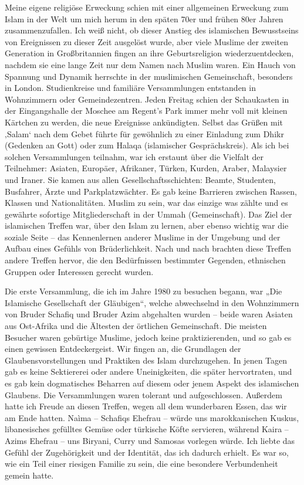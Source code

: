 \documentclass[12pt]{memoir}
\begin{document}
Meine eigene religiöse Erweckung schien
mit einer allgemeinen Erweckung zum Islam in der Welt um mich herum
in den späten 70er und frühen 80er Jahren zusammenzufallen.
Ich weiß nicht, ob dieser Anstieg des islamischen Bewusstseins
von Ereignissen zu dieser Zeit ausgelöst wurde,
aber viele Muslime der zweiten Generation in Großbritannien fingen an
ihre Geburtsreligion wiederzuentdecken,
nachdem sie eine lange Zeit nur dem Namen nach Muslim waren.
Ein Hauch von Spannung und Dynamik herrschte
in der muslimischen Gemeinschaft, besonders in London.
Studienkreise und familiäre Versammlungen entstanden
in Wohnzimmern oder Gemeindezentren.
Jeden Freitag schien der Schaukasten in der Eingangshalle
der Moschee am Regent’s Park immer mehr voll mit kleinen Kärtchen zu werden,
die neue Ereignisse ankündigten.
Selbst das Grüßen mit ‚Salam‘ nach dem Gebet führte für gewöhnlich
zu einer Einladung zum Dhikr (Gedenken an Gott)
oder zum Halaqa (islamischer Gesprächskreis).
Als ich bei solchen Versammlungen teilnahm,
war ich erstaunt über die Vielfalt der Teilnehmer:
Asiaten, Europäer, Afrikaner, Türken, Kurden, Araber, Malaysier und Iraner.
Sie kamen aus allen Gesellschaftsschichten:
Beamte, Studenten, Busfahrer, Ärzte und Parkplatzwächter.
Es gab keine Barrieren zwischen Rassen, Klassen und Nationalitäten.
Muslim zu sein, war das einzige was zählte und es gewährte
sofortige Mitgliederschaft in der Ummah (Gemeinschaft).
Das Ziel der islamischen Treffen war, über den Islam zu lernen,
aber ebenso wichtig war die soziale Seite –
das Kennenlernen anderer Muslime in der Umgebung
und der Aufbau eines Gefühls von Brüderlichkeit.
Nach und nach brachten diese Treffen andere Treffen hervor,
die den Bedürfnissen bestimmter Gegenden,
ethnischen Gruppen oder Interessen gerecht wurden.

Die erste Versammlung, die ich im Jahre 1980 zu besuchen begann,
war „Die Islamische Gesellschaft der Gläubigen“,
welche abwechselnd in den Wohnzimmern von Bruder Schafiq und Bruder Azim
abgehalten wurden – beide waren Asiaten aus Ost-Afrika
und die Ältesten der örtlichen Gemeinschaft.
Die meisten Besucher waren gebürtige Muslime, jedoch keine praktizierenden,
und so gab es einen gewissen Entdeckergeist.
Wir fingen an, die Grundlagen der Glaubensvorstellungen
und Praktiken des Islam durchzugehen.
In jenen Tagen gab es keine Sektiererei oder andere Uneinigkeiten,
die später hervortraten, und es gab kein dogmatisches Beharren
auf diesem oder jenem Aspekt des islamischen Glaubens.
Die Versammlungen waren tolerant und aufgeschlossen.
Außerdem hatte ich Freude an diesen Treffen, wegen all dem wunderbaren Essen,
das wir am Ende hatten. Na\`ima – Schafiqs Ehefrau –
würde uns marokkanischen Kuskus, libanesisches gefülltes Gemüse
oder türkische Köfte servieren, während Kaira – Azims Ehefrau –
uns Biryani, Curry und Samosas vorlegen würde.
Ich liebte das Gefühl der Zugehörigkeit und der Identität,
das ich dadurch erhielt.
Es war so, wie ein Teil einer riesigen Familie zu sein,
die eine besondere Verbundenheit gemein hatte.
\end{document}

